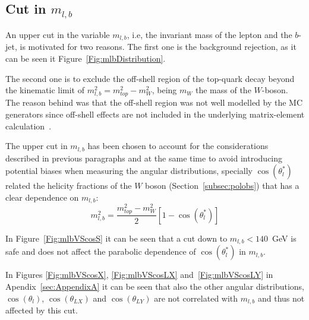 \subsection{Cut in \boldmath$m_{l,b}$}

An upper cut in the variable $m_{l,b}$, i.e, the invariant mass of the lepton and the $b$-jet, is motivated for two reasons. The first one is the background rejection, as it can be seen it Figure~\ref{Fig:mlbDistribution}. %

The second one is to exclude the off-shell region of the top-quark decay beyond the kinematic limit of $m_{l,b}^2 = {m_{top}^2 - m_W^2}$, being $m_W$ the mass of the $W$-boson. The reason behind was that the off-shell region was not well modelled by the MC generators since off-shell effects are not included in the underlying matrix-element calculation~\cite{Aaboud:2017pdi}.

The upper cut in $m_{l,b}$ has been chosen to account for the considerations described in previous paragraphs and at the same time to avoid introducing potential biases when measuring the angular distributions, specially $\cos(\theta^{*}_l)$ related the helicity fractions of the $W$ boson (Section~\ref{subsec:polobs}) that has a clear dependence on $m_{l,b}$:
\begin{equation*}
m_{l,b}^2 = \frac{m_{top}^2 - m_W^2}{2} [1-\cos(\theta^{*}_l)]
\end{equation*}

In Figure~\ref{Fig:mlbVScosS} it can be seen that a cut down to  $m_{l,b}<140$~GeV is safe and does not affect the parabolic dependence of $\cos(\theta^{*}_l)$ in $m_{l,b}$.

In Figures \ref{Fig:mlbVScosX}, \ref{Fig:mlbVScosLX} and~\ref{Fig:mlbVScosLY} in Apendix~\ref{sec:AppendixA} it can be seen that also the other angular distributions, $\cos(\theta_l)$, $\cos(\theta_{LX})$ and $\cos(\theta_{LY})$ are not correlated with $m_{l,b}$ and thus not affected by this cut.


